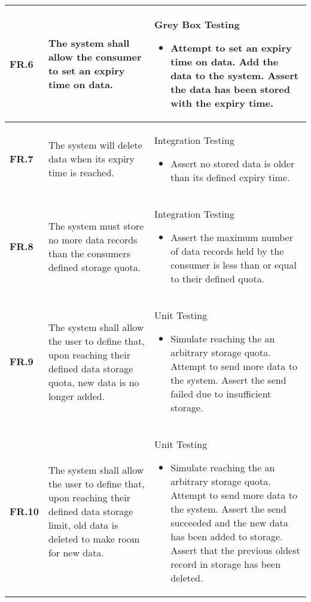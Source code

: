 \begin{table}
\begin{tabular}{|l|l|l|}
        \textbf{FR.6}  & The system shall allow the consumer to set an expiry time on data.                                                                             & Grey Box Testing\begin{itemize}\item Attempt to set an expiry time on data. Add the data to the system. Assert the data has been stored with the expiry time.\end{itemize}                                                                                                         \\ \hline
        \textbf{FR.7}  & The system will delete data when its expiry time is reached.                                                                                   & Integration Testing\begin{itemize}\item Assert no stored data is older than its defined expiry time.\end{itemize}                                                                                                                                                                  \\ \hline
        \textbf{FR.8}  & The system must store no more data records than the consumers defined storage quota.                                                           & Integration Testing\begin{itemize}\item Assert the maximum number of data records held by the consumer is less than or equal to their defined quota.\end{itemize}                                                                                                                  \\ \hline
        \textbf{FR.9}  & The system shall allow the user to define that, upon reaching their defined data storage quota, new data is no longer added.                   & Unit Testing\begin{itemize}\item Simulate reaching the an arbitrary storage quota. Attempt to send more data to the system. Assert the send failed due to insufficient storage.\end{itemize}                                                                                       \\ \hline
    	\textbf{FR.10} & The system shall allow the user to define that, upon reaching their defined data storage limit, old data is deleted to make room for new data. & Unit Testing\begin{itemize}\item Simulate reaching the an arbitrary storage quota. Attempt to send more data to the system. Assert the send succeeded and the new data has been added to storage. Assert that the previous oldest record in storage has been deleted.\end{itemize} \\ \hline
	\end{tabular}
\end{table}
